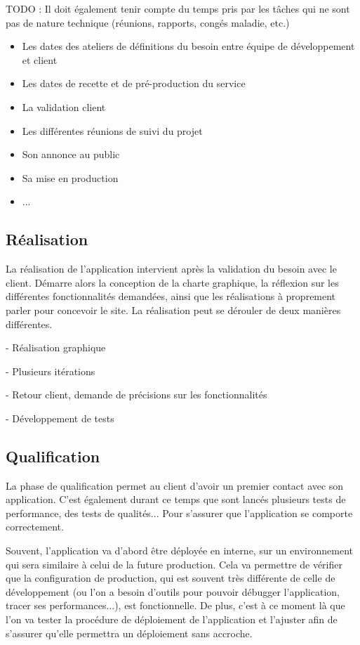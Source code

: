 TODO : Il doit également tenir compte du temps pris par les tâches qui ne sont pas de nature technique (réunions, rapports, congés maladie, etc.) 

\begin{itemize}
	\item Les dates des ateliers de définitions du besoin entre équipe de développement et client
	\item Les dates de recette et de pré-production du service
	\item La validation client
	\item Les différentes réunions de suivi du projet 
	\item Son annonce au public
	\item Sa mise en production
	\item ...
\end{itemize}



\subsection{Réalisation}

La réalisation de l'application intervient après la validation du besoin avec le client. Démarre alors la conception de la charte graphique, la réflexion sur les différentes fonctionnalités demandées, ainsi que les réalisations à proprement parler pour concevoir le site. La réalisation peut se dérouler de deux manières différentes.

- Réalisation graphique

- Plusieurs itérations

- Retour client, demande de précisions sur les fonctionnalités

- Développement de tests


\subsection{Qualification}

La phase de qualification permet au client d'avoir un premier contact avec son application. C'est également durant ce temps que sont lancés plusieurs tests de performance, des tests de qualités... Pour s'assurer que l'application se comporte correctement.

Souvent, l'application va d'abord être déployée en interne, sur un environnement qui sera similaire à celui de la future production. Cela va permettre de vérifier que la configuration de production, qui est souvent très différente de celle de développement (ou l'on a besoin d'outils pour pouvoir débugger l'application, tracer ses performances...), est fonctionnelle. De plus, c'est à ce moment là que l'on va tester la procédure de déploiement de l'application et l'ajuster afin de s'assurer qu'elle permettra un déploiement sans accroche.

